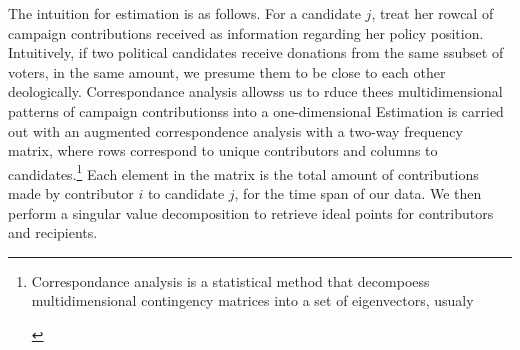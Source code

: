 \documentclass[12pt,english]{article}
\newcommand{\note}[1]{\footnote{ \begin{doublespace}#1  \end{doublespace}}}
\numberwithin{equation}{section}
\theoremstyle{plain}
\theoremstyle{remark}
\theoremstyle{plain}
\begin{document}
The intuition for estimation is as follows. For a candidate $j$, treat her rowcal of campaign contributions received as information regarding her policy position. Intuitively, if two political candidates receive donations from the same ssubset of voters, in the same amount, we presume them to be close to each other deologically. Correspondance analysis allowss us to rduce thees multidimensional patterns of campaign contributionss into a one-dimensional Estimation is carried out with an augmented correspondence analysis with a two-way frequency matrix, where rows correspond to unique contributors and columns to candidates.\note{Correspondance analysis is a statistical method that decompoess multidimensional contingency matrices into a set of eigenvectors, usualy } Each element in the matrix is the total amount of contributions made by contributor $i$ to candidate $j$, for the time span of our data. We then perform a singular value decomposition to retrieve ideal points for contributors and recipients.
    
    
\end{document}

